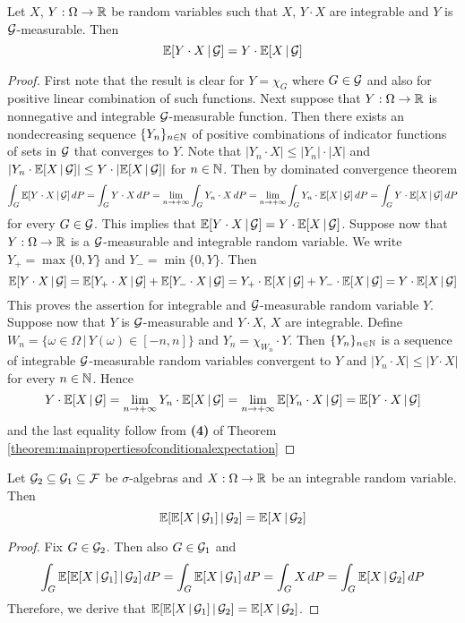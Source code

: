 \begin{theorem}\label{theorem:multiplicationofconditionalexpectation}
Let $X$, $Y:\Omega \rightarrow {\mathbb R}$ be random variables such that $X$, $Y\cdot X$ are integrable and $Y$ is ${\mathcal G}$-measurable. Then
$$\mathbb{E}[Y\cdot X\,|\,{\mathcal G}] = Y\cdot \mathbb{E}[X\,|\,{\mathcal G}]$$
\end{theorem}
\begin{proof}
First note that the result is clear for $Y = \chi_G$ where $G\in {\mathcal G}$ and also for positive linear combination of such functions. Next suppose that $Y:\Omega \rightarrow {\mathbb R}$ is nonnegative and integrable ${\mathcal G}$-measurable function. Then there exists an nondecreasing sequence $\{Y_n\}_{n\in {\mathbb N}}$ of positive combinations of indicator functions of sets in ${\mathcal G}$ that converges to $Y$. Note that $|Y_n\cdot X|\leq |Y_n|\cdot |X|$ and $|Y_n\cdot \mathbb{E}[X\,|\,{\mathcal G}]|\leq Y\cdot |\mathbb{E}[X\,|\,{\mathcal G}]|$ for $n\in {\mathbb N}$. Then by dominated convergence theorem
$$\int_G \mathbb{E}[Y\cdot X\,|\,{\mathcal G}]\,dP = \int_G Y\cdot X\,dP = \lim_{n\rightarrow +\infty}\int_G Y_n\cdot X\,dP = \lim_{n\rightarrow +\infty} \int_G Y_n\cdot \mathbb{E}[X\,|\,{\mathcal G}]\,dP = \int_G Y\cdot \mathbb{E}[X\,|\,{\mathcal G}]\,dP$$
for every $G\in {\mathcal G}$. This implies that $\mathbb{E}[Y\cdot X\,|\,{\mathcal G}] = Y\cdot \mathbb{E}[X\,|\,{\mathcal G}]$. Suppose now that $Y:\Omega \rightarrow {\mathbb R}$ is a ${\mathcal G}$-measurable and integrable random variable. We write $Y_+ = \max\{0,Y\}$ and $Y_- = \min\{0,Y\}$. Then
$$\mathbb{E}[Y\cdot X\,|\,{\mathcal G}] = \mathbb{E}[Y_+\cdot X\,|\,{\mathcal G}]+\mathbb{E}[Y_-\cdot X\,|\,{\mathcal G}]= Y_+\cdot\mathbb{E}[ X\,|\,{\mathcal G}] + Y_-\cdot\mathbb{E}[ X\,|\,{\mathcal G}] = Y\cdot \mathbb{E}[X\,|\,{\mathcal G}]$$
This proves the assertion for integrable and ${\mathcal G}$-measurable random variable $Y$. Suppose now that $Y$ is ${\mathcal G}$-measurable and $Y\cdot X$, $X$ are integrable. Define $W_n=\{\omega \in \Omega\,|\,Y(\omega)\in [-n, n]\}$ and $Y_n = \chi_{W_n}\cdot Y$. Then $\{Y_n\}_{n\in {\mathbb N}}$ is a sequence of integrable ${\mathcal G}$-measurable random variables convergent to $Y$ and $|Y_n\cdot X|\leq |Y\cdot X|$ for every $n\in {\mathbb N}$. Hence
$$Y\cdot \mathbb{E}[X\,|\,{\mathcal G}] = \lim_{n\rightarrow +\infty}Y_n\cdot \mathbb{E}[X\,|\,{\mathcal G}] = \lim_{n\rightarrow +\infty}\mathbb{E}[Y_n\cdot X\,|\,{\mathcal G}] = \mathbb{E}[Y\cdot X\,|\,{\mathcal G}]$$
and the last equality follow from \textbf{(4)} of Theorem \ref{theorem:mainpropertiesofconditionalexpectation}
\end{proof}

\begin{theorem}\label{theorem:towerproperty}
Let ${\mathcal G}_2\subseteq {\mathcal G}_1\subseteq {\mathcal F}$ be $\sigma$-algebras and $X:\Omega \rightarrow {\mathbb R}$ be an integrable random variable. Then
$$\mathbb{E}[\mathbb{E}[X\,|\,{\mathcal G}_1]\,|\,{\mathcal G}_2] = \mathbb{E}[X\,|\,{\mathcal G}_2]$$
\end{theorem}
\begin{proof}
Fix $G\in {\mathcal G}_2$. Then also $G\in {\mathcal G}_1$ and
$$\int_G\mathbb{E}[\mathbb{E}[X\,|\,{\mathcal G}_1]\,|\,{\mathcal G}_2]\,dP = \int_G \mathbb{E}[X\,|\,{\mathcal G}_1]\,dP = \int_G X\,dP = \int_G \mathbb{E}[X\,|\,{\mathcal G}_2]\,dP$$ 
Therefore, we derive that $\mathbb{E}[\mathbb{E}[X\,|\,{\mathcal G}_1]\,|\,{\mathcal G}_2] = \mathbb{E}[X\,|\,{\mathcal G}_2]$.
\end{proof}

